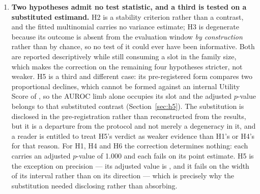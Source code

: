 \begin{enumerate}
    \item \textbf{Two hypotheses admit no test statistic, and a third is tested
    on a substituted estimand.} H2 is a stability criterion rather than a
    contrast, and the fitted multinomial carries no variance estimate; H3 is
    degenerate because its outcome is absent from the evaluation window
    \emph{by construction} rather than by chance, so no test of it could ever
    have been informative. Both are reported descriptively while still
    consuming a slot in the family size, which makes the correction on the
    remaining four hypotheses stricter, not weaker. H5 is a third and different
    case: its pre-registered form compares two proportional declines, which
    cannot be formed against an internal Utility Score of
    \pcUtilityMaxPrimaryB, so the AUROC limb alone occupies its slot and the
    adjusted $p$-value belongs to that substituted contrast
    (Section~\ref{sec:h5}). The substitution is disclosed in the pre-registration
    rather than reconstructed from the results, but it is a departure from the
    protocol and not merely a degeneracy in it, and a reader is entitled to
    treat H5's verdict as weaker evidence than H1's or H4's for that reason.
    For H1, H4 and H6 the correction determines nothing: each carries an
    adjusted $p$-value of 1.000 and each fails on its point estimate. H5 is the
    exception on precision --- its adjusted value is \pcHFivePHolm, and it fails
    on the width of its interval rather than on its direction --- which is
    precisely why the substitution needed disclosing rather than absorbing.
\end{enumerate}
